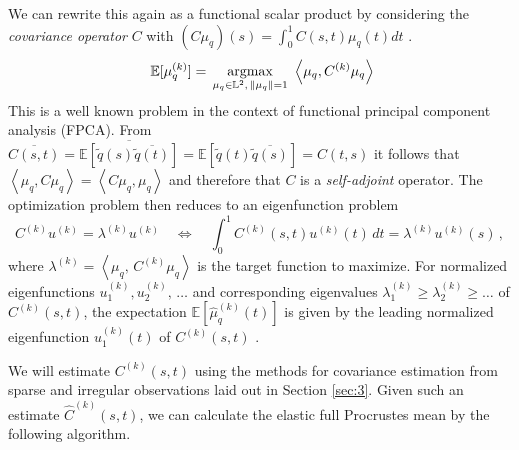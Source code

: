 We can rewrite this again as a functional scalar product by considering the \emph{covariance operator} $C$ with $(C\mu_q)(s) = \int_0^1 C(s,t) \mu_q(t) dt$ \parencite[see][153]{RamsaySilverman2005}.
\begin{equation}\
  \label{eq:quadr_opt}
  \mathbb{E}[\mu_q^{(k)}] = \, \operatorname*{argmax}_{\mu_q \in \mathbb{L}^2,\,\lVert\mu_q\rVert = 1}\,\,
    \left\langle \mu_q, C^{(k)}\mu_q \right\rangle
\end{equation}
This is a well known problem in the context of functional principal component analysis (FPCA).
From $\overline{C(s,t)} = \overline{\mathbb{E}[\widetilde q(s)\overline{\widetilde q(t)}]} = \mathbb{E}[\widetilde q(t)\overline{\widetilde q(s)}] = C(t,s)$ it follows that $\left\langle \mu_q, C \mu_q \right\rangle = \left\langle C \mu_q, \mu_q \right\rangle$ and therefore that $C$ is a \emph{self-adjoint} operator.
The optimization problem then reduces to an eigenfunction problem 
\begin{equation}
  \label{eq:funceig}
  C^{(k)} u^{(k)} = \lambda^{(k)} u^{(k)} \quad \Leftrightarrow \quad \int_0^1 C^{(k)}(s, t) u^{(k)}(t)\, dt = \lambda^{(k)} u^{(k)}(s)\,,
\end{equation}
where $\lambda^{(k)} = \left\langle \mu_q,\, C^{(k)} \mu_q \right\rangle$ is the target function to maximize.
For normalized eigenfunctions $u^{(k)}_1, u^{(k)}_2,\,\dots$ and corresponding eigenvalues $\lambda^{(k)}_1 \geq \lambda^{(k)}_2 \geq \dots$ of $C^{(k)}(s,t)$, the expectation $\mathbb{E}[\hat\mu_q^{(k)}(t)]$ is given by the leading normalized eigenfunction $u^{(k)}_1(t)$ of $C^{(k)}(s,t)$ \parencite[see][153,397]{RamsaySilverman2005}.

We will estimate $C^{(k)}(s,t)$ using the methods for covariance estimation from sparse and irregular observations laid out in Section \ref{sec:3}.
Given such an estimate $\hat C^{(k)}(s,t)$, we can calculate the elastic full Procrustes mean by the following algorithm.

